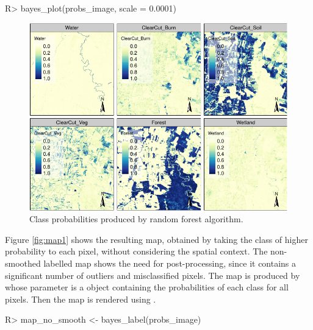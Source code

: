 \documentclass[
  shortnames]{jss}
\begin{document}
\begin{CodeChunk}
\begin{CodeInput}
R> bayes_plot(probs_image, scale = 0.0001)
\end{CodeInput}
\begin{figure}[h]

{\centering \includegraphics{Bayesian_smoothing_JSS_files/figure-latex/pcube-1} 

}

\caption[Class probabilities produced by random forest algorithm]{Class probabilities produced by random forest algorithm.}\label{fig:pcube}
\end{figure}
\end{CodeChunk}

Figure \ref{fig:map1} shows the resulting map, obtained by taking the class of higher probability to each pixel, without considering the spatial context. The non-smoothed labelled map shows the need for post-processing, since it contains a significant number of outliers and misclassified pixels. The map is produced by  whose parameter is a  object containing the probabilities of each class for all pixels. Then the map is rendered using .

\begin{CodeChunk}
\begin{CodeInput}
R> map_no_smooth <- bayes_label(probs_image)
\end{CodeInput}
\end{CodeChunk}
\end{document}
